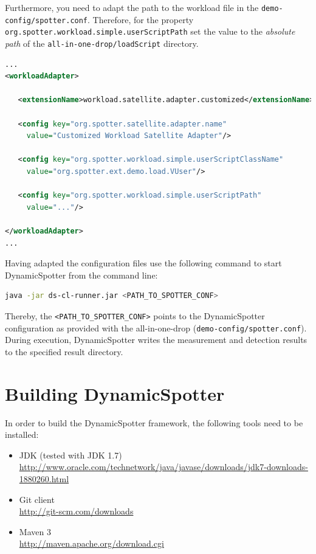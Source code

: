 \documentclass{report}
\newcommand{\DS}{DynamicSpotter }
\newcommand{\link}[1]{\textcolor[rgb]{0.0,0.0,1.0}{\href{#1}{#1}}}
\begin{document}
Furthermore, you need to adapt the path to the workload file in the \texttt{demo-config/spotter.conf}. Therefore,
for the property \texttt{org.spotter.workload.simple.userScriptPath} set the value to the \emph{absolute path} of the
\texttt{all-in-one-drop/loadScript} directory.

\begin{lstlisting}[language=xml,morekeywords={java,javaagent,port, rootDir}, frame=single]
...
<workloadAdapter>

   <extensionName>workload.satellite.adapter.customized</extensionName>
   
   <config key="org.spotter.satellite.adapter.name" 
     value="Customized Workload Satellite Adapter"/>
     
   <config key="org.spotter.workload.simple.userScriptClassName" 
     value="org.spotter.ext.demo.load.VUser"/>
     
   <config key="org.spotter.workload.simple.userScriptPath" 
     value="..."/>
     
</workloadAdapter>
...
\end{lstlisting}
Having adapted the configuration files use the following command to start \DS from the command line:
\begin{lstlisting}[language=sh,morekeywords={java,javaagent,port, rootDir}, frame=single]
java -jar ds-cl-runner.jar <PATH_TO_SPOTTER_CONF>
\end{lstlisting}
Thereby, the \texttt{<PATH\_TO\_SPOTTER\_CONF>} points to the \DS configuration as provided with the all-in-one-drop
(\texttt{demo-config/spotter.conf}). During execution, \DS writes the measurement and detection results to the specified
result directory.


\newpage
\section{Building \DS}
\label{sec:buildingDynamicSpotter}
In order to build the \DS framework, the following tools need to be installed:
\begin{itemize}
  \item JDK (tested with JDK
  1.7)\\ \link{http://www.oracle.com/technetwork/java/javase/downloads/jdk7-downloads-1880260.html}
  \item Git client \\ \link{http://git-scm.com/downloads}
  \item Maven 3 \\ \link{http://maven.apache.org/download.cgi}
\end{itemize}
\end{document}
